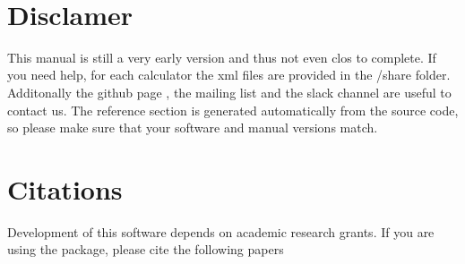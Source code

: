 \begin{titlepage}


\vspace*{1cm}

\vspace*{3cm}
\vspace*{1cm}
\vfill

\vspace*{0.5cm}
\center{\large{\today}} \\
\vspace*{0.3cm}
\end{titlepage}

\section*{Disclamer}
This manual is still a very early version and thus not even clos to complete. If 
you need help, for each calculator the xml files are provided in the /share 
folder. Additonally the github page 
, the mailing list and the slack channel are useful to contact us. 
The reference section is generated automatically from the source code, so please 
make sure that your software and manual versions match.  

\section*{Citations}
Development of this software depends on academic research grants. If you are 
using the package, please cite the  following papers \\

